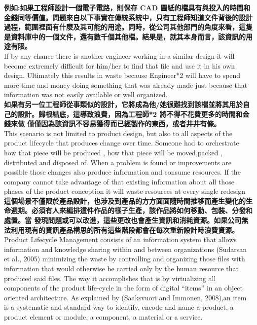 \documentclass[24pt]{article} %
\begin{document}
\textbf{例如:如果工程師設計一個電子電路，則保存 CAD 圖紙的檔具有與投入的時間和金錢同等價值。問題來自以下事實在傳統系統中，只有工程師知道文件背後的設計過程，範圍裡面有什麼及其可能的用途。同時，從公司其他部門的角度來看，這隻是資料庫中的一個文件，還有數千個其他檔。結果是，就其本身而言，該資訊的用途有限。}\\

If by any chance there is another engineer working in a similar design it will become extremely difficult for him/her to find that file and use it in his own design. Ultimately this results in waste because Engineer*2 will have to spend more time and money doing something that was already made just because that information was not easily available or well organized.\\

\textbf{如果有另一位工程師從事類似的設計，它將成為他/她很難找到該檔並將其用於自己的設計。歸根結底，這導致浪費，因為工程師*2 將不得不花費更多的時間和金錢來做 僅僅因為該資訊不容易獲得而已經製作的東西，或者井井有條。}\\

This scenario is not limited to product design, but also to all aspects of the product lifecycle that produces change over time. Someone had to orchestrate how that piece will be produced , how that piece will be moved,packed , distributed and disposed of. When a problem is found or improvements are possible those changes also produce information and consume resources. If the company cannot take advantage of that existing information about all those phases of the product conception it will waste resources at every single redesign\\

\textbf{這個場景不僅限於產品設計，也涉及到產品的方方面面隨時間推移而產生變化的生命週期。必須有人來編排這件作品的樣子生產，該作品將如何移動、包裝、分發和處置。當 發現問題或可以改進，這些更改也會產生資訊和消耗資源。如果公司無法利用現有的資訊產品構思的所有這些階段都會在每次重新設計時浪費資源。}\\

Product Lifecycle Management consists of an information system that allows information and knowledge sharing within and between organizations (Sudarsan et al., 2005) minimizing the waste by controlling and organizing those files with information that would otherwise be carried only by the human resource that produced said files. The way it accomplishes that is by virtualizing all components of the product life-cycle in the form of digital “items” in an object oriented architecture. As explained by (Saaksvuori and Immonen, 2008),an item is a systematic and standard way to identify, encode and name a product, a product element or module, a component, a material or a service.\\
\end{document}
